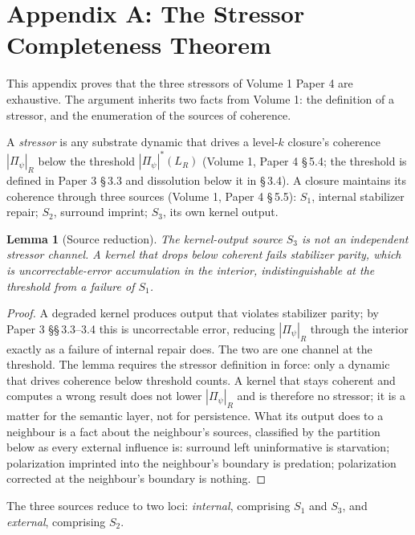 \documentclass[11pt,oneside]{report}
\newtheorem{lemma}[theorem]{Lemma}
\theoremstyle{definition}
\theoremstyle{remark}
\begin{document}
\section*{Appendix A: The Stressor Completeness Theorem}

This appendix proves that the three stressors of Volume 1 Paper 4 are exhaustive. The argument inherits two facts from Volume 1: the definition of a stressor, and the enumeration of the sources of coherence.

A \emph{stressor} is any substrate dynamic that drives a level-\ensuremath{k} closure's coherence \ensuremath{|\Pi_\psi|_R} below the threshold \ensuremath{|\Pi_\psi|^*(L_R)} (Volume 1, Paper 4 \S\,5.4; the threshold is defined in Paper 3 \S\,3.3 and dissolution below it in \S\,3.4). A closure maintains its coherence through three sources (Volume 1, Paper 4 \S\,5.5): \ensuremath{S_1}, internal stabilizer repair; \ensuremath{S_2}, surround imprint; \ensuremath{S_3}, its own kernel output.

\begin{lemma}[Source reduction]
The kernel-output source \ensuremath{S_3} is not an independent stressor channel. A kernel that drops below coherent fails stabilizer parity, which is uncorrectable-error accumulation in the interior, indistinguishable at the threshold from a failure of \ensuremath{S_1}.
\end{lemma}

\begin{proof}
A degraded kernel produces output that violates stabilizer parity; by Paper 3 \S\S\,3.3--3.4 this is uncorrectable error, reducing \ensuremath{|\Pi_\psi|_R} through the interior exactly as a failure of internal repair does. The two are one channel at the threshold. The lemma requires the stressor definition in force: only a dynamic that drives coherence below threshold counts. A kernel that stays coherent and computes a wrong result does not lower \ensuremath{|\Pi_\psi|_R} and is therefore no stressor; it is a matter for the semantic layer, not for persistence. What its output does to a neighbour is a fact about the neighbour's sources, classified by the partition below as every external influence is: surround left uninformative is starvation; polarization imprinted into the neighbour's boundary is predation; polarization corrected at the neighbour's boundary is nothing.
\end{proof}

The three sources reduce to two loci: \emph{internal}, comprising \ensuremath{S_1} and \ensuremath{S_3}, and \emph{external}, comprising \ensuremath{S_2}.
\end{document}
